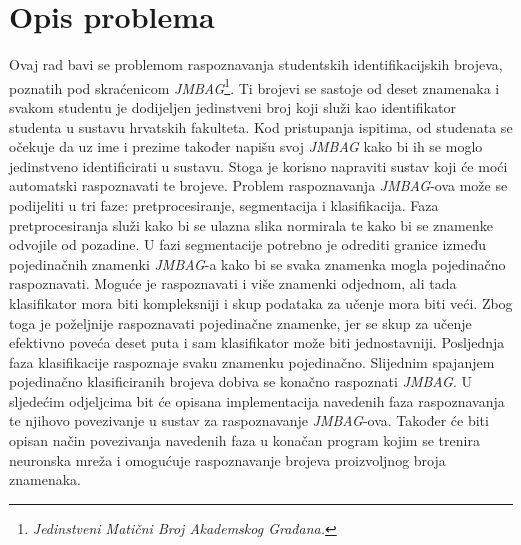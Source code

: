 \chapter{Opis problema}
\label{ch:opis-problema}
Ovaj rad bavi se problemom raspoznavanja studentskih identifikacijskih brojeva, poznatih pod skraćenicom
\emph{JMBAG}\footnote{\emph{Jedinstveni Matični Broj Akademskog Građana.}}. Ti brojevi se sastoje od deset znamenaka i
svakom studentu je dodijeljen jedinstveni broj koji služi kao identifikator studenta u sustavu hrvatskih fakulteta.
Kod pristupanja ispitima, od studenata se očekuje da uz ime i prezime također napišu svoj \emph{JMBAG} kako bi ih se
moglo jedinstveno identificirati u sustavu. Stoga je korisno napraviti sustav koji će moći automatski raspoznavati te
brojeve. Problem raspoznavanja \emph{JMBAG}-ova može se podijeliti u tri faze: pretprocesiranje, segmentacija i
klasifikacija. Faza pretprocesiranja služi kako bi se ulazna slika normirala te kako bi se znamenke odvojile od
pozadine. U fazi segmentacije potrebno je odrediti granice između pojedinačnih znamenki \emph{JMBAG}-a kako bi se svaka
znamenka mogla pojedinačno raspoznavati. Moguće je raspoznavati i više znamenki odjednom, ali tada klasifikator mora
biti kompleksniji i skup podataka za učenje mora biti veći. Zbog toga je poželjnije raspoznavati pojedinačne znamenke,
jer se skup za učenje efektivno poveća deset puta i sam klasifikator može biti jednostavniji. Posljednja faza
klasifikacije raspoznaje svaku znamenku pojedinačno. Slijednim spajanjem pojedinačno klasificiranih brojeva dobiva se
konačno raspoznati \emph{JMBAG}. U sljedećim odjeljcima bit će opisana implementacija navedenih faza raspoznavanja te
njihovo povezivanje u sustav za raspoznavanje \emph{JMBAG}-ova. Također će biti opisan način povezivanja navedenih faza
u konačan program kojim se trenira neuronska mreža i omogućuje raspoznavanje brojeva proizvoljnog broja znamenaka.
\newpage

